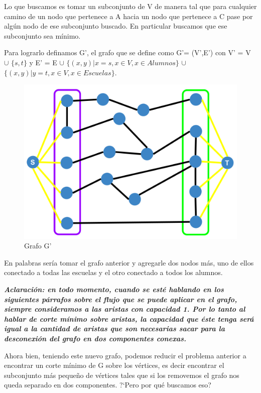 Lo que buscamos es tomar un subconjunto de V de manera tal que para cualquier camino de un nodo que pertenece a A hacia un nodo que pertenece a C pase por algún nodo de ese subconjunto buscado. En particular buscamos que ese subconjunto sea mínimo.

Para lograrlo definamos G', el grafo que se define como G'= (V',E') con V' = V $\cup$ $\{s,t\}$ y E' = E $\cup$ $\{(x,y)| x = s, x \in V , x \in Alumnos \}$ $\cup$ $\{(x,y)| y = t, x \in V , x \in Escuelas \}$.

\begin{figure}[h!]
  \centering
    \includegraphics[scale = 0.225]{img/gprima.png}
    \caption{Grafo G'}
\end{figure}

En palabras sería tomar el grafo anterior y agregarle dos nodos más, uno de ellos conectado a todas las escuelas y el otro conectado a todos los alumnos.

\textbf{\textit{Aclaración: en todo momento, cuando se esté hablando en los siguientes párrafos sobre el flujo que se puede aplicar en el grafo, siempre consideramos a las aristas con capacidad 1. Por lo tanto al hablar de corte mínimo sobre aristas, la capacidad que éste tenga será igual a la cantidad de aristas que son necesarias sacar para la desconexión del grafo en dos componentes conexas.}}

Ahora bien, teniendo este nuevo grafo, podemos reducir el problema anterior a encontrar un corte mínimo de G sobre los vértices, es decir encontrar el subconjunto más pequeño de vértices tales que si los removemos el grafo nos queda separado en dos componentes. ?`Pero por qué buscamos eso?

